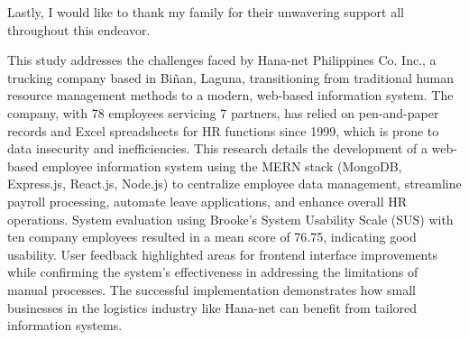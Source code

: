 \documentclass{icsthesis}
\begin{document}
\begin{frontmatter}
\begin{acknowledgement}
Lastly, I would like to thank my family for their unwavering support all throughout this endeavor.
		\end{acknowledgement}
		
		\maketableofcontents
		
		\makelistoftables

		\makelistoffigures
	
		
		\begin{abstractwithpageno}	
\justifying
\setlength{\parindent}{2em}
This study addresses the challenges faced by Hana-net Philippines Co. Inc., a trucking company based in Biñan, Laguna, transitioning from traditional human resource management methods to a modern, web-based information system. The company, with 78 employees servicing 7 partners, has relied on pen-and-paper records and Excel spreadsheets for HR functions since 1999, which is prone to data insecurity and inefficiencies. This research details the development of a web-based employee information system using the MERN stack (MongoDB, Express.js, React.js, Node.js) to centralize employee data management, streamline payroll processing, automate leave applications, and enhance overall HR operations. System evaluation using Brooke's System Usability Scale (SUS) with ten company employees resulted in a mean score of 76.75, indicating good usability. User feedback highlighted areas for frontend interface improvements while confirming the system's effectiveness in addressing the limitations of manual processes. The successful implementation demonstrates how small businesses in the logistics industry like Hana-net can benefit from tailored information systems.
\end{abstractwithpageno}


	\end{frontmatter}
	
\end{document}
